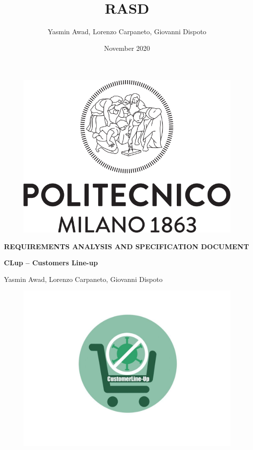 \documentclass[a4paper, 12pt, oneside]{article}
\title{RASD}
\author{Yasmin Awad, Lorenzo Carpaneto, Giovanni Dispoto}
\date{November 2020}
\begin{document}
\begin{titlepage}
\begin{figure}[h!]
    \centering
    \includegraphics[scale=0.5]{img/logopoli.png}
\end{figure}
\vspace{0.7em}
\begin{center}
    \Large \textbf{REQUIREMENTS ANALYSIS AND SPECIFICATION DOCUMENT}
\end{center}
\begin{center}
    \Large \textbf{CLup – Customers Line-up } 
\end{center}
\vspace{-0.6em}
\begin{center}
    \normalsize Yasmin Awad, Lorenzo Carpaneto, Giovanni Dispoto
    \begin{figure}[h!]
    \centering
    \includegraphics[scale=0.25]{img/GUI/logo.jpg}

\end{figure}
\end{center}
\end{titlepage}
\end{document}
